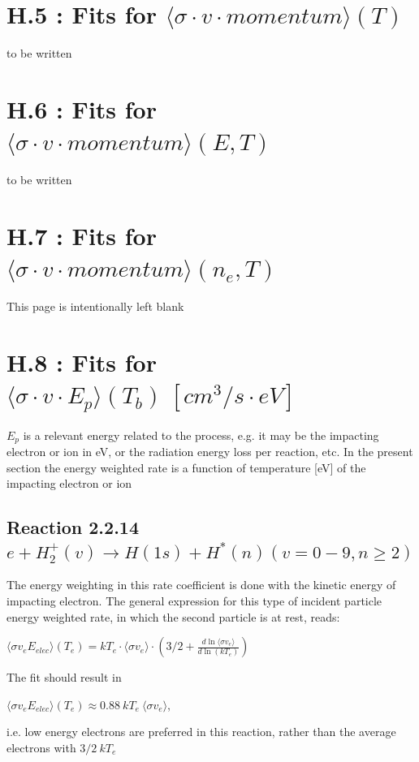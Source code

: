 \documentclass[12pt,dvips]{article}
\begin{document}
\section{H.5 : Fits for $\langle\sigma \cdot v \cdot momentum \rangle (T) $}

to be written

\section{H.6 : Fits for $\langle\sigma \cdot v \cdot momentum \rangle (E,T) $ }


to be written

\section{H.7 : Fits for $\langle\sigma \cdot v \cdot momentum \rangle (n_e,T) $ }

\newpage
This page is intentionally left blank
\newpage

\section{H.8 : Fits for $\langle\sigma \cdot v \cdot E_p \rangle (T_b) \ [cm^3/s
\cdot eV]$}

$E_p$ is a relevant energy related to the process, e.g. it may be the impacting electron or ion in eV,
or the radiation energy loss per reaction, etc.
In the present section
the energy weighted rate is a function of temperature [eV] of the
impacting electron or ion

\subsection{
Reaction 2.2.14   $e + H_2^+(v) \rightarrow H(1s) + H^*(n)   (v=0-9, n \ge 2) $
}
The energy weighting in this rate coefficient is done with the kinetic energy of
impacting electron. The general expression for this type of incident particle energy weighted
rate, in which the second particle is at rest, reads:

$\langle\sigma v_e E_{elec}\rangle(T_e) = kT_e \cdot \langle\sigma v_e\rangle \cdot
\left(3/2 + \frac{d \ln \langle\sigma v_e\rangle}{d \ln(kT_e)}\right)$

The fit should result in

$\langle\sigma v_e E_{elec}\rangle(T_e) \approx 0.88 ~kT_e ~\langle\sigma v_e\rangle$,

i.e. low energy electrons are preferred in this reaction, rather than the average electrons with $3/2~kT_e$
\end{document}
